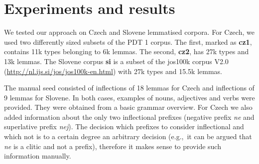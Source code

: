 \documentclass[11pt]{article}
\newcommand{\e}[1]{\textit{#1}} %
\newcommand{\eg}{e.g.,~}
\begin{document}
%
%

\section{Experiments and results}

We tested our approach on Czech and Slovene lemmatised corpora. For Czech, we used two differently sized subsets of the PDT 1 corpus. The first, marked as \textbf{cz1}, contains 11k types belonging to 6k lemmas. The second, \textbf{cz2}, has 27k types and 13k lemmas. The Slovene corpus \textbf{si} is a subset of the jos100k corpus V2.0 (\url{http://nl.ijs.si/jos/jos100k-en.html}) with 27k types and 15.5k lemmas.

The manual seed consisted of inflections of 18 lemmas for Czech and inflections of 9 lemmas for Slovene.  In both cases, examples of nouns, adjectives and verbs were provided. They were obtained from a basic grammar overview. For Czech we also added information about the only two inflectional prefixes (negative prefix \e{ne} and superlative prefix \e{nej}). The decision which prefixes to consider inflectional and which not is to a certain degree an arbitrary decision (\eg it can be argued that \e{ne} is a clitic and not a prefix), therefore it makes sense to provide such information manually.
\end{document}
